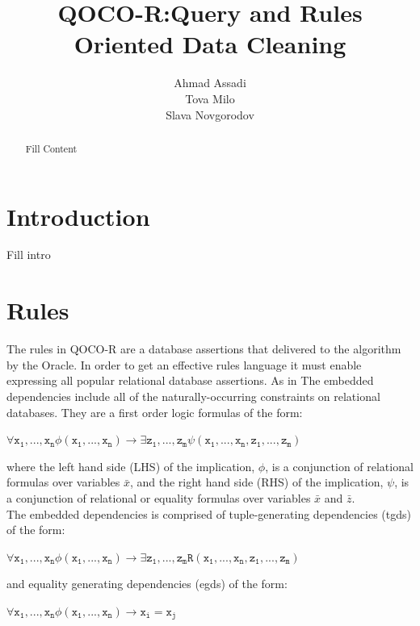 \documentclass{vldb}
\begin{document}

\title{QOCO-R:Query and Rules Oriented Data Cleaning}



\author{
\alignauthor
Ahmad Assadi\\
\alignauthor
Tova Milo\\
\alignauthor 
Slava Novgorodov\\
}
\maketitle


\begin{abstract}
Fill Content
\end{abstract}

\section{Introduction}
Fill intro

\section{Rules}
The rules in QOCO-R are a database assertions that delivered to the algorithm by the Oracle. In order to get an effective rules language it must enable expressing all popular relational database assertions. As in \cite{queryreformulation,dataexchange} The embedded dependencies include all of the naturally-occurring constraints on relational databases. They are a first order logic formulas of the form:
\begin{center}
$\mathtt{\forall x_{1},...,x_{n} \phi(x_{1},...,x_{n}) \rightarrow \exists z_{1},...,z_{m} \psi(x_{1},...,x_{n},z_{1},...,z_{m}) }$
\end{center}
where the left hand side (LHS) of the implication, $\phi$, is a conjunction
of relational formulas over variables $\bar{x}$, and the right hand side (RHS)
of the implication, $\psi$, is a conjunction of relational or equality formulas over variables $\bar{x}$
and $\bar{z}$.\\
The embedded dependencies is comprised of tuple-generating dependencies (tgds) of the form:
\begin{center}
$\mathtt{\forall x_{1},...,x_{n} \phi(x_{1},...,x_{n}) \rightarrow \exists z_{1},...,z_{m} R(x_{1},...,x_{n},z_{1},...,z_{m}) }$
\end{center}
and equality generating dependencies (egds) of the form:
\begin{center}
$\mathtt{\forall x_{1},...,x_{n} \phi(x_{1},...,x_{n}) \rightarrow x_{i} = x_{j} }$
\end{center}
\end{document}
